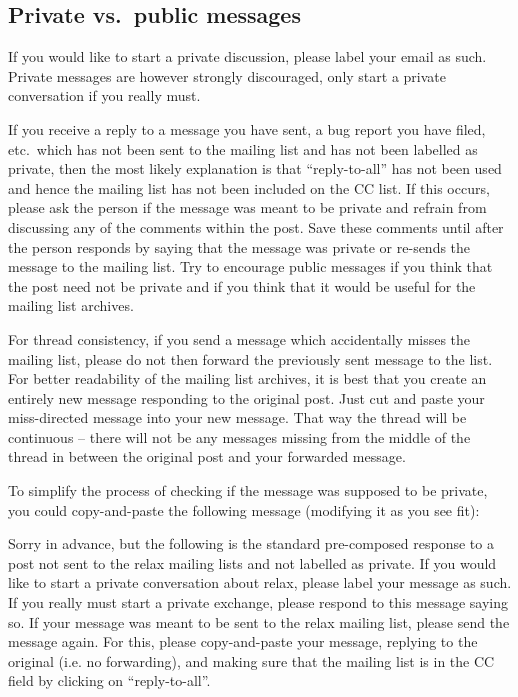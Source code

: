 \subsection{Private vs.\ public messages}

If you would like to start a private discussion, please label your email as such.  Private messages are however strongly discouraged, only start a private conversation if you really must.

If you receive a reply to a message you have sent, a bug report you have filed, etc.\ which has not been sent to the mailing list and has not been labelled as private, then the most likely explanation is that ``reply-to-all'' has not been used and hence the mailing list has not been included on the CC list.  If this occurs, please ask the person if the message was meant to be private and refrain from discussing any of the comments within the post.  Save these comments until after the person responds by saying that the message was private or re-sends the message to the mailing list.  Try to encourage public messages if you think that the post need not be private and if you think that it would be useful for the mailing list archives.

For thread consistency, if you send a message which accidentally misses the mailing list, please do not then forward the previously sent message to the list.  For better readability of the mailing list archives, it is best that you create an entirely new message responding to the original post.  Just cut and paste your miss-directed message into your new message.  That way the thread will be continuous -- there will not be any messages missing from the middle of the thread in between the original post and your forwarded message.

To simplify the process of checking if the message was supposed to be private, you could copy-and-paste the following message (modifying it as you see fit):

\begin{exampleenv}
Sorry in advance, but the following is the standard pre-composed response to a post not sent to the relax mailing lists and not labelled as private.  If you would like to start a private conversation about relax, please label your message as such.  If you really must start a private exchange, please respond to this message saying so.  If your message was meant to be sent to the relax mailing list, please send the message again.  For this, please copy-and-paste your message, replying to the original (i.e. no forwarding), and making sure that the mailing list is in the CC field by clicking on ``reply-to-all''.
\end{exampleenv}




